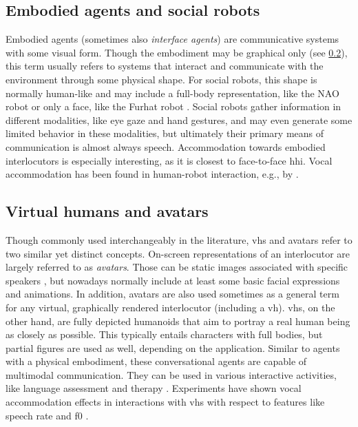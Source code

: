 \subsection{Embodied agents and social robots}
\label{subsec:embodied_agents}

Embodied agents (sometimes also \emph{interface agents}) are communicative systems with some visual form.
Though the embodiment may be graphical only (see \cref{subsec:virtual_humans}), this term usually refers to systems that interact and communicate with the environment through some physical shape.
For social robots, this shape is normally human-like and may include a full-body representation, like the NAO robot \citep{Singh2016nao} or only a face, like the Furhat robot \citep{AlMoubayed2012furhat}.
Social robots gather information in different modalities, like eye gaze and hand gestures, and may even generate some limited behavior in these modalities, but ultimately their primary means of communication is almost always speech.
Accommodation towards embodied interlocutors is especially interesting, as it is closest to face-to-face \ac{hhi}.
Vocal accommodation has been found in human-robot interaction, e.g., by \citet{Ibrahim2019fundamental}.

\subsection{Virtual humans and avatars}
\label{subsec:virtual_humans}

Though commonly used interchangeably in the literature, \acp{vh} and avatars refer to two similar yet distinct concepts.
On-screen representations of an interlocutor are largely referred to as \emph{avatars}.
Those can be static images associated with specific speakers \citep[as in][]{Cohn2020Interspeech}, but nowadays normally include at least some basic facial expressions and animations.
In addition, avatars are also used sometimes as a general term for any virtual, graphically rendered interlocutor (including a \ac{vh}).
\Acp{vh}, on the other hand, are fully depicted humanoids that aim to portray a real human being as closely as possible.
This typically entails characters with full bodies, but partial figures are used as well, depending on the application.
Similar to agents with a physical embodiment, these conversational agents are capable of multimodal communication.
They can be used in various interactive activities, like language assessment \citep{Peterson2005learning} and therapy \citep{Devault2014simsensei}.
Experiments have shown vocal accommodation effects in interactions with \acp{vh} with respect to features like speech rate and \acl{f0} \citep{Gijssels2016speech, Staum2010virtually}.

